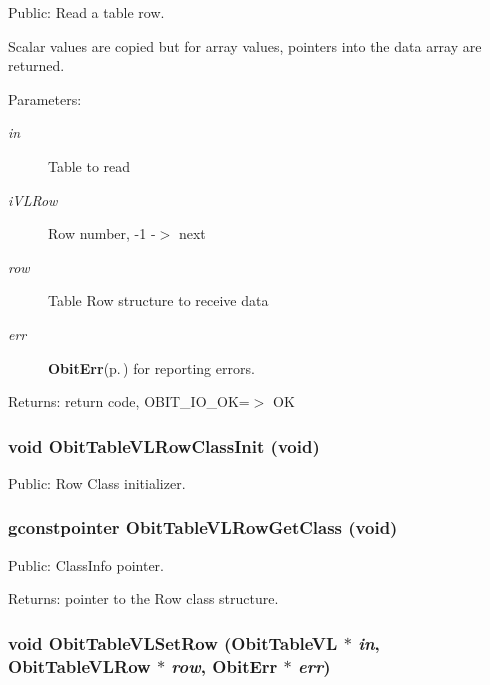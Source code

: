 Public: Read a table row. 

Scalar values are copied but for array values, pointers into the data array are returned. \begin{Desc}
\item[Parameters:]
\begin{description}
\item[{\em in}]Table to read \item[{\em i\-VLRow}]Row number, -1 -$>$ next \item[{\em row}]Table Row structure to receive data \item[{\em err}]{\bf Obit\-Err}{\rm (p.\,\pageref{structObitErr})} for reporting errors. \end{description}
\end{Desc}
\begin{Desc}
\item[Returns:]return code, OBIT\_\-IO\_\-OK=$>$ OK \end{Desc}
\subsubsection{\setlength{\rightskip}{0pt plus 5cm}void Obit\-Table\-VLRow\-Class\-Init (void)}\label{ObitTableVL_8h_a7}


Public: Row Class initializer. 

\subsubsection{\setlength{\rightskip}{0pt plus 5cm}gconstpointer Obit\-Table\-VLRow\-Get\-Class (void)}\label{ObitTableVL_8h_a9}


Public: Class\-Info pointer. 

\begin{Desc}
\item[Returns:]pointer to the Row class structure. \end{Desc}
\subsubsection{\setlength{\rightskip}{0pt plus 5cm}void Obit\-Table\-VLSet\-Row ({\bf Obit\-Table\-VL} $\ast$ {\em in}, {\bf Obit\-Table\-VLRow} $\ast$ {\em row}, {\bf Obit\-Err} $\ast$ {\em err})}\label{ObitTableVL_8h_a19}


